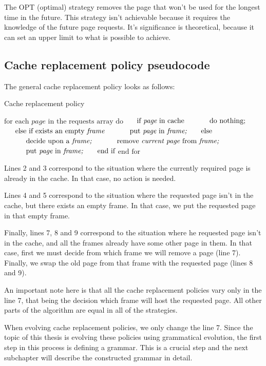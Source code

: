 The OPT (optimal) strategy removes the page that won't be used for the longest time in the future. This strategy isn't achievable because it requires the knowledge of the future page requests. It's significance is theoretical, because it can set an upper limit to what is possible to achieve.

\subsection{Cache replacement policy pseudocode}
The general cache replacement policy looks as follows:

\begin{algorithm}[]
\caption{Cache replacement policy}
\begin{algorithmic}[1]
\State $\text{for each } \textit{page} \text{ in the requests array do}$
\State $\indent \text{if } \textit{page} \text{ in cache} $
\State $\indent \indent \text{do nothing;} $
\State $\indent \text{else if exists an empty } \textit{frame} $
\State $\indent \indent \text{put } \textit{page} \text{ in } \textit{frame;} $
\State $\indent \text{else} $
\State $\indent \indent \text{decide upon a } \textit{frame;}$
\State $\indent \indent \text{remove } \textit{current page} 
\text{ from } \textit{frame;}$
\State $\indent \indent \text{put } \textit{page} \text{ in } \textit{frame;} $
\State $\indent \text{end if}$
\State $\text{end for}$
\end{algorithmic}
\end{algorithm}

Lines 2 and 3 correspond to the situation where the currently required page is already in the cache. In that case, no action is needed.

Lines 4 and 5 correspond to the situation where the requested page isn't in the cache, but there exists an empty frame. In that case, we put the requested page in that empty frame.

Finally, lines 7, 8 and 9 correspond to the situation where he requested page isn't in the cache, and all the frames already have some other page in them. In that case, first we must decide from which frame we will remove a page (line 7). Finally, we swap the old page from that frame with the requested page (lines 8 and 9).

An important note here is that all the cache replacement policies vary only in the line 7, that being the decision which frame will host the requested page. All other parts of the algorithm are equal in all of the strategies. 

When evolving cache replacement policies, we only change the line 7. Since the topic of this thesis is evolving these policies using grammatical evolution, the first step in this process is defining a grammar. This is a crucial step and the next subchapter will describe the constructed grammar in detail.